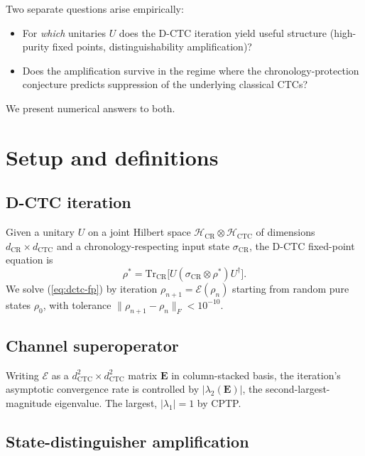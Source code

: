 \documentclass[11pt,a4paper]{article}
\begin{document}
Two separate questions arise empirically:

\begin{itemize}
\item For \emph{which} unitaries $U$ does the D-CTC iteration yield
useful structure (high-purity fixed points, distinguishability
amplification)?
\item Does the amplification survive in the regime where the
chronology-protection conjecture \cite{Hawking1992} predicts
suppression of the underlying classical CTCs?
\end{itemize}

We present numerical answers to both.

\section{Setup and definitions}

\subsection{D-CTC iteration}

Given a unitary $U$ on a joint Hilbert space
$\mathcal{H}_{\text{CR}} \otimes \mathcal{H}_{\text{CTC}}$ of dimensions
$d_{\text{CR}} \times d_{\text{CTC}}$ and a chronology-respecting input
state $\sigma_{\text{CR}}$, the D-CTC fixed-point equation is
\begin{equation}
\rho^* = \mathrm{Tr}_{\text{CR}}\!\big[ U(\sigma_{\text{CR}} \otimes \rho^*) U^\dagger \big].
\label{eq:dctc-fp}
\end{equation}
We solve (\ref{eq:dctc-fp}) by iteration
$\rho_{n+1} = \mathcal{E}(\rho_n)$ starting from random pure states
$\rho_0$, with tolerance $\|\rho_{n+1} - \rho_n\|_F < 10^{-10}$.

\subsection{Channel superoperator}

Writing $\mathcal{E}$ as a $d_{\text{CTC}}^2 \times d_{\text{CTC}}^2$
matrix $\mathbf{E}$ in column-stacked basis, the iteration's
asymptotic convergence rate is controlled by $|\lambda_2(\mathbf{E})|$,
the second-largest-magnitude eigenvalue. The largest, $|\lambda_1| = 1$
by CPTP.

\subsection{State-distinguisher amplification}
\end{document}
